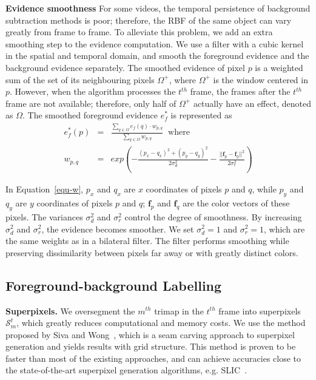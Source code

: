 \textbf{Evidence smoothness}
For some videos, the temporal persistence of background subtraction methods is poor; therefore, the RBF of the same object can vary greatly from frame to frame.
To alleviate this problem, we add an extra smoothing step to the evidence computation. We use a filter with a cubic kernel in the spatial and temporal domain, and smooth the foreground evidence and the background evidence separately.
The smoothed evidence of pixel $p$ is a weighted sum of the set of its neighbouring pixels $\Omega^{+}$, where $\Omega^{+}$ is the window centered in $p$.
However, when the algorithm processes the $t^{th}$ frame, the frames after the $t^{th}$ frame are not available; therefore, only half of $\Omega^{+}$ actually have an effect, denoted as $\Omega$. The smoothed foreground evidence $e_{f}^{*}$ is represented as
\begin{eqnarray}
	e_{f}^{*}(p)&=&\frac{\sum_{q\in\Omega}{e_{f}(q)\cdot w_{p,q}}}{\sum_{q\in\Omega}{w_{p,q}}} \;\; \mbox{where} \label{equ-w} \\
	w_{p,q}&=&exp(-\frac{(p_{x}-q_{x})^2+(p_{y}-q_{y})^2}{2\sigma_{d}^{2}}-\frac{||\mathbf{f}_{p}-\mathbf{f}_{q}||^2}{2\sigma_{r}^2}) \nonumber
\end{eqnarray}

In Equation~\ref{equ-w}, $p_{x}$ and $q_{x}$ are $x$ coordinates of pixels $p$ and $q$, while $p_{y}$ and $q_{y}$ are $y$ coordinates of pixels $p$ and $q$; $\mathbf{f}_{p}$ and $\mathbf{f}_{q}$ are the color vectors of these pixels.
The variances $\sigma_{d}^{2}$ and $\sigma_{r}^2$ control the degree of smoothness. By increasing $\sigma_{d}^{2}$ and $\sigma_{r}^2$, the evidence becomes smoother. We set $\sigma_{d}^{2}=1$ and $\sigma_{r}^2=1$, which are the same weights as in a bilateral filter. The filter performs smoothing while preserving dissimilarity between pixels far away or with greatly distinct colors.

\subsection{Foreground-background Labelling}
\label{sec:vos:m:fbl}

\textbf{Superpixels.}
We oversegment the $m^{th}$ trimap in the $t^{th}$ frame into superpixels $\mathcal{S}_{m}^{t}$, which greatly reduces computational and memory costs.
We use the method proposed by Siva and Wong~\cite{siva2014}, which is a seam carving approach to superpixel generation and yields results with grid structure. This method is proven to be faster than most of the existing approaches, and can achieve accuracies close to the state-of-the-art superpixel generation algorithms, e.g. SLIC~\cite{achanta2012}.


